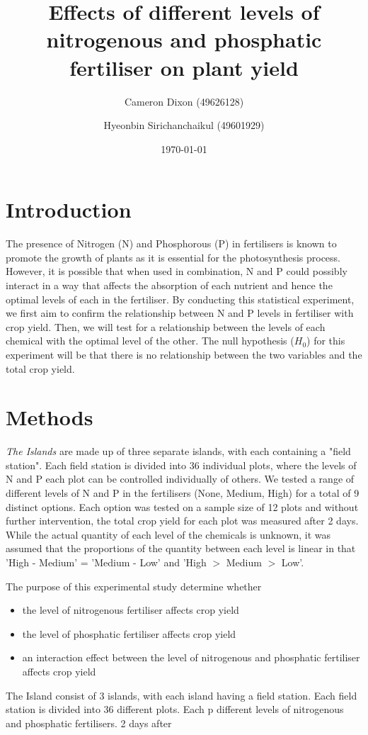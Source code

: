 \documentclass[12pt]{article}
\title{Effects of different levels of nitrogenous and phosphatic fertiliser on plant yield}
\author{Cameron Dixon (49626128)}
\author{Hyeonbin Sirichanchaikul (49601929)}
\affil{The University of Queensland}
\date{\today}
\begin{document}
\maketitle

\section{Introduction}
The presence of Nitrogen (N) and Phosphorous (P) in fertilisers is known to promote the growth of plants as it is essential for the photosynthesis process. 
However, it is possible that when used in combination, N and P could possibly interact in a way that affects the absorption of each nutrient and hence the optimal levels of each in the fertiliser.
By conducting this statistical experiment, we first aim to confirm the relationship between N and P levels in fertiliser with crop yield.
Then, we will test for a relationship between the levels of each chemical with the optimal level of the other.
The null hypothesis ($H_0$) for this experiment will be that there is no relationship between the two variables and the total crop yield.

\section{Methods}
\textit{The Islands} are made up of three separate islands, with each containing a "field station".
Each field station is divided into 36 individual plots, where the levels of N and P each plot can be controlled individually of others.
We tested a range of different levels of N and P in the fertilisers (None, Medium, High) for a total of 9 distinct options.
Each option was tested on a sample size of 12 plots and without further intervention, the total crop yield for each plot was measured after 2 days.
While the actual quantity of each level of the chemicals is unknown, it was assumed that the proportions of the quantity between each level is linear in that 'High - Medium' = 'Medium - Low' and 'High $>$ Medium $>$ Low'.

The purpose of this experimental study determine whether
\begin{itemize}
    \item the level of nitrogenous fertiliser affects crop yield
    \item the level of phosphatic fertiliser affects crop yield
    \item an interaction effect between the level of nitrogenous and phosphatic fertiliser affects crop yield
\end{itemize}
The Island consist of 3 islands, with each island having a field station.
Each field station is divided into 36 different plots.
Each p different levels of nitrogenous and phosphatic fertilisers.
2 days after
\end{document}
